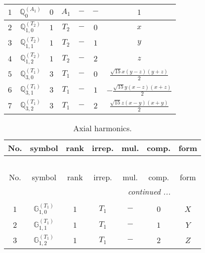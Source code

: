 \documentclass[fleqn,10pt,landscape]{article}
\begin{document}
\begin{itemize}
\begin{center}
\begin{longtable}{ccccccc}
$ 1 $ & $ \mathbb{Q}_{0}^{(A_{1})} $ & $ 0 $ & $ A_{1} $ & $ - $ & $ - $ & $ 1 $ \\ \hline
$ 2 $ & $ \mathbb{Q}_{1,0}^{(T_{2})} $ & $ 1 $ & $ T_{2} $ & $ - $ & $ 0 $ & $ x $ \\
$ 3 $ & $ \mathbb{Q}_{1,1}^{(T_{2})} $ & $ 1 $ & $ T_{2} $ & $ - $ & $ 1 $ & $ y $ \\
$ 4 $ & $ \mathbb{Q}_{1,2}^{(T_{2})} $ & $ 1 $ & $ T_{2} $ & $ - $ & $ 2 $ & $ z $ \\ \hline
$ 5 $ & $ \mathbb{Q}_{3,0}^{(T_{1})} $ & $ 3 $ & $ T_{1} $ & $ - $ & $ 0 $ & $ \frac{\sqrt{15} x \left(y - z\right) \left(y + z\right)}{2} $ \\
$ 6 $ & $ \mathbb{Q}_{3,1}^{(T_{1})} $ & $ 3 $ & $ T_{1} $ & $ - $ & $ 1 $ & $ - \frac{\sqrt{15} y \left(x - z\right) \left(x + z\right)}{2} $ \\
$ 7 $ & $ \mathbb{Q}_{3,2}^{(T_{1})} $ & $ 3 $ & $ T_{1} $ & $ - $ & $ 2 $ & $ \frac{\sqrt{15} z \left(x - y\right) \left(x + y\right)}{2} $ \\
\end{longtable}
\end{center}
\begin{center}
\renewcommand{\arraystretch}{1.3}
\begin{longtable}{ccccccc}
\caption{Axial harmonics.}
 \\
 \hline \hline
No. & symbol & rank & irrep. & mul. & comp. & form \\ \hline \endfirsthead

\multicolumn{6}{l}{\tablename\ \thetable{}} \\
 \hline \hline
No. & symbol & rank & irrep. & mul. & comp. & form \\ \hline \endhead

 \hline \hline
\multicolumn{6}{r}{\footnotesize\it continued ...} \\ \endfoot

 \hline \hline
\multicolumn{6}{r}{} \\ \endlastfoot

$ 1 $ & $ \mathbb{G}_{1,0}^{(T_{1})} $ & $ 1 $ & $ T_{1} $ & $ - $ & $ 0 $ & $ X $ \\
$ 2 $ & $ \mathbb{G}_{1,1}^{(T_{1})} $ & $ 1 $ & $ T_{1} $ & $ - $ & $ 1 $ & $ Y $ \\
$ 3 $ & $ \mathbb{G}_{1,2}^{(T_{1})} $ & $ 1 $ & $ T_{1} $ & $ - $ & $ 2 $ & $ Z $ \\
\end{longtable}
\end{center}


\end{itemize}
\end{document}
